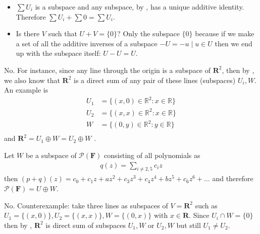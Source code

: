 \exo{} \begin{itemize}
\item $\sum U_i$ is a subspace and any subspace, by , has a unique additive identity. Therefore $\sum U_i + \sum 0 = \sum U_i$.
\item  Is there $V$ such that $U+V = \{0\}$? Only the subspace $\{0\}$ because if we make a set of all the additive inverses of a subspace $-U = {-u \mid u\in U}$ then we end up with the subspace itself: $ U - U = U$. 
\end{itemize}
\exo{} No. For instance, since any line through the origin is a subspace of $\mathbf{R}^2$, then by , we also know 
that $\mathbf{R}^2$ is a direct sum of any pair of these lines (subspaces) $U_i, W$. 
An example is
\begin{align*}
  U_1 &= \{(x,0)\in \mathbb{R}^2 :x \in \mathbb{R} \}  \\
  U_2 &= \{(x,x)\in \mathbb{R}^2 :x \in \mathbb{R} \}  \\
  W   &= \{(0,y)\in \mathbb{R}^2 :y \in \mathbb{R} \}  \\
\end{align*}
and $\mathbf{R}^2 = U_1 \oplus W = U_2 \oplus W $ .

\exo{} Let $W$ be a subspace of $\mathcal{P}(\mathbf{F})$ consisting of all polynomials as
\begin{align}
  q(z) = \sum\limits_{i\neq2,5} c_i z
\end{align}
then $(p+q)(z) = c_0 + c_1z + a z^2+ c_3 z^3 + c_4 z^4 + b z^5 + c_6 z^6 + ...$ and therefore $\mathcal{P}(\mathbf{F}) = U \oplus W$. 

\exo{} No. Counterexample: take three lines as subspaces of $V=\mathbf{R}^2$ such as $U_1=\{(x,0)\}, U_2=\{(x,x)\}, W=\{(0,x)\}$ with $x\in \mathbf{R}$. Since
$U_i\cap W = \{0\}$ then by , $\mathbf{R}^2$ is direct sum of subspaces $U_1,W$ or $U_2,W$ but still $U_1\neq U_2$. 

